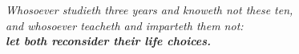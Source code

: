 {\fontsize{25}{30}\selectfont\color{muted}\itshape
 Whosoever studieth three years and knoweth not these ten,\\
 and whosoever teacheth and imparteth them not:\\
 \upshape\bfseries\color{trap} let both reconsider their life choices.}%

